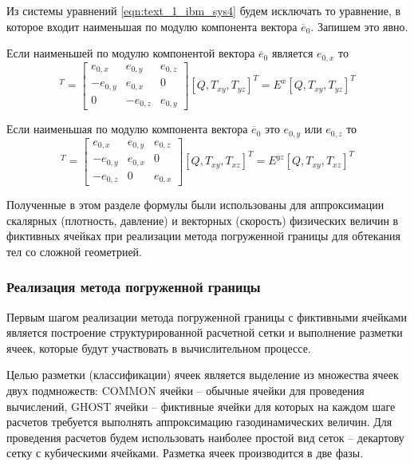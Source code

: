 Из системы уравнений \eqref{eqn:text_1_ibm_sys4} будем исключать то уравнение, в которое входит наименьшая по модулю компонента вектора $\overline{e}_0$.
Запишем это явно.

Если наименьшей по модулю компонентой вектора $\overline{e}_0$ является $e_{0,x}$ то
\begin{equation}
	[v_{G,x}, v_{G,y}, v_{G,z}]^T =
	\begin{bmatrix}
		e_{0,x} & e_{0,y} & e_{0,z} \\
		-e_{0,y} & e_{0,x} & 0 \\
		0 & -e_{0,z} & e_{0,y}
	\end{bmatrix}
	[Q, T_{xy}, T_{yz}]^T = E^x[Q, T_{xy}, T_{yz}]^T
\end{equation}

Если наименьшая по модулю компонента вектора $\overline{e}_0$ это $e_{0,y}$ или $e_{0,z}$ то
\begin{equation}
	[v_{G,x}, v_{G,y}, v_{G,z}]^T =
	\begin{bmatrix}
		e_{0,x} & e_{0,y} & e_{0,z} \\
		-e_{0,y} & e_{0,x} & 0 \\
		-e_{0,z} & 0 & e_{0,x}
	\end{bmatrix}
	[Q, T_{xy}, T_{xz}]^T = E^{yz}[Q, T_{xy}, T_{xz}]^T
\end{equation}

Полученные в этом разделе формулы были использованы для аппроксимации скалярных (плотность, давление) и векторных (скорость) физических величин в фиктивных ячейках при реализации метода погруженной границы для обтекания тел со сложной геометрией.

\subsubsection{Реализация метода погруженной границы}\label{sec:text_1_immersed_boundary_method_realization}

Первым шагом реализации метода погруженной границы с фиктивными ячейками является построение структурированной расчетной сетки и выполнение разметки ячеек, которые будут участвовать в вычислительном процессе.


Целью разметки (классификации) ячеек является выделение из множества ячеек двух подмножеств: COMMON ячейки -- обычные ячейки для проведения вычислений, GHOST ячейки -- фиктивные ячейки для которых на каждом шаге расчетов требуется выполнять аппроксимацию газодинамических величин.
Для проведения расчетов будем использовать наиболее простой вид сеток -- декартову сетку с кубическими ячейками.
Разметка ячеек производится в две фазы.

